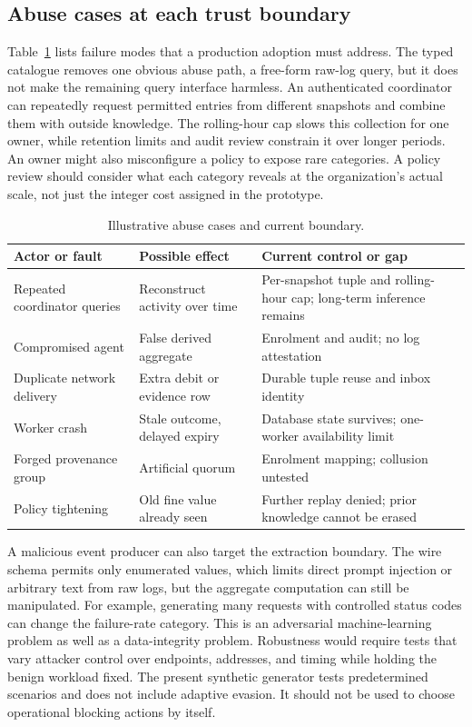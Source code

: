 \documentclass[conference,letterpaper]{IEEEtran}
\begin{document}
\subsection{Abuse cases at each trust boundary}
Table~\ref{tab:abuse} lists failure modes that a production adoption must address. The typed catalogue removes one obvious abuse path, a free-form raw-log query, but it does not make the remaining query interface harmless. An authenticated coordinator can repeatedly request permitted entries from different snapshots and combine them with outside knowledge. The rolling-hour cap slows this collection for one owner, while retention limits and audit review constrain it over longer periods. An owner might also misconfigure a policy to expose rare categories. A policy review should consider what each category reveals at the organization's actual scale, not just the integer cost assigned in the prototype.

\begin{table}[t]
\centering\caption{Illustrative abuse cases and current boundary.}
\label{tab:abuse}\scriptsize\setlength{\tabcolsep}{2pt}
\begin{tabular}{p{}p{}p{}}\hline
Actor or fault & Possible effect & Current control or gap \\\hline
Repeated coordinator queries & Reconstruct activity over time & Per-snapshot tuple and rolling-hour cap; long-term inference remains\\
Compromised agent & False derived aggregate & Enrolment and audit; no log attestation\\
Duplicate network delivery & Extra debit or evidence row & Durable tuple reuse and inbox identity\\
Worker crash & Stale outcome, delayed expiry & Database state survives; one-worker availability limit\\
Forged provenance group & Artificial quorum & Enrolment mapping; collusion untested\\
Policy tightening & Old fine value already seen & Further replay denied; prior knowledge cannot be erased\\\hline
\end{tabular}
\end{table}

A malicious event producer can also target the extraction boundary. The wire schema permits only enumerated values, which limits direct prompt injection or arbitrary text from raw logs, but the aggregate computation can still be manipulated. For example, generating many requests with controlled status codes can change the failure-rate category. This is an adversarial machine-learning problem as well as a data-integrity problem. Robustness would require tests that vary attacker control over endpoints, addresses, and timing while holding the benign workload fixed. The present synthetic generator tests predetermined scenarios and does not include adaptive evasion. It should not be used to choose operational blocking actions by itself.
\end{document}
